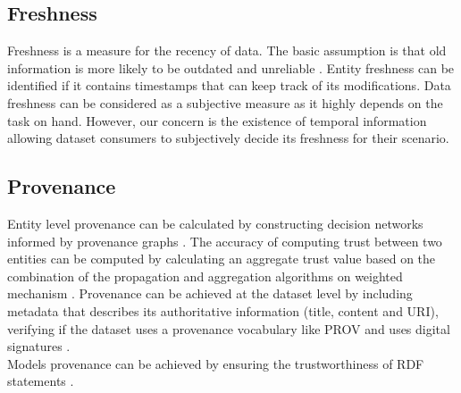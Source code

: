\documentclass[onecolumn, crcready]{iosart2c}
\begin{document}


\subsection{Freshness}

Freshness is a measure for the recency of data. The basic assumption is that old information is more likely to be outdated and unreliable \cite{Flouris2012}. Entity freshness can be identified if it contains timestamps that can keep track of its modifications. Data freshness can be considered as a subjective measure as it highly depends on the task on hand. However, our concern is the existence of temporal information allowing dataset consumers to subjectively decide its freshness for their scenario.

\subsection{Provenance}

Entity level provenance can be calculated by constructing decision networks informed by provenance graphs \cite{Gamble2011}. The accuracy of computing trust between two entities \cite{Framework2012} can be computed by calculating an aggregate trust value based on the combination of the propagation and aggregation algorithms on weighted mechanism \cite{j.websem208}. Provenance can be achieved at the dataset level by including metadata that describes its authoritative information (title, content and URI), verifying if the dataset uses a provenance vocabulary like PROV \cite{w3c-prov-o} and uses digital signatures \cite{Framework2012}. \\ Models provenance can be achieved by ensuring the trustworthiness of RDF statements \cite{Hartig09usingweb}.
\end{document}
